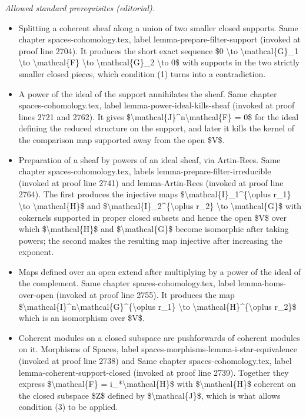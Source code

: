 \documentclass[10pt,a4paper]{amsart}
\theoremstyle{plain}
\theoremstyle{definition}
\theoremstyle{remark}
\numberwithin{equation}{subsection}
\begin{document}
\noindent\textit{Allowed standard prerequisites (editorial).}\begin{itemize}
\item Splitting a coherent sheaf along a union of two smaller closed supports. Same chapter spaces-cohomology.tex, label lemma-prepare-filter-support (invoked at proof line 2704). It produces the short exact sequence \$0 \textbackslash{}to \textbackslash{}mathcal\{G\}\_1 \textbackslash{}to \textbackslash{}mathcal\{F\} \textbackslash{}to \textbackslash{}mathcal\{G\}\_2 \textbackslash{}to 0\$ with supports in the two strictly smaller closed pieces, which condition (1) turns into a contradiction.
\item A power of the ideal of the support annihilates the sheaf. Same chapter spaces-cohomology.tex, label lemma-power-ideal-kills-sheaf (invoked at proof lines 2721 and 2762). It gives \$\textbackslash{}mathcal\{J\}\textasciicircum{}n\textbackslash{}mathcal\{F\} = 0\$ for the ideal defining the reduced structure on the support, and later it kills the kernel of the comparison map supported away from the open \$V\$.
\item Preparation of a sheaf by powers of an ideal sheaf, via Artin-Rees. Same chapter spaces-cohomology.tex, labels lemma-prepare-filter-irreducible (invoked at proof line 2741) and lemma-Artin-Rees (invoked at proof line 2764). The first produces the injective maps \$\textbackslash{}mathcal\{I\}\_1\textasciicircum{}\{\textbackslash{}oplus r\_1\} \textbackslash{}to \textbackslash{}mathcal\{H\}\$ and \$\textbackslash{}mathcal\{I\}\_2\textasciicircum{}\{\textbackslash{}oplus r\_2\} \textbackslash{}to \textbackslash{}mathcal\{G\}\$ with cokernels supported in proper closed subsets and hence the open \$V\$ over which \$\textbackslash{}mathcal\{H\}\$ and \$\textbackslash{}mathcal\{G\}\$ become isomorphic after taking powers; the second makes the resulting map injective after increasing the exponent.
\item Maps defined over an open extend after multiplying by a power of the ideal of the complement. Same chapter spaces-cohomology.tex, label lemma-homs-over-open (invoked at proof line 2755). It produces the map \$\textbackslash{}mathcal\{I\}\textasciicircum{}n\textbackslash{}mathcal\{G\}\textasciicircum{}\{\textbackslash{}oplus r\_1\} \textbackslash{}to \textbackslash{}mathcal\{H\}\textasciicircum{}\{\textbackslash{}oplus r\_2\}\$ which is an isomorphism over \$V\$.
\item Coherent modules on a closed subspace are pushforwards of coherent modules on it. Morphisms of Spaces, label spaces-morphisms-lemma-i-star-equivalence (invoked at proof line 2738) and Same chapter spaces-cohomology.tex, label lemma-coherent-support-closed (invoked at proof line 2739). Together they express \$\textbackslash{}mathcal\{F\} = i\_*\textbackslash{}mathcal\{H\}\$ with \$\textbackslash{}mathcal\{H\}\$ coherent on the closed subspace \$Z\$ defined by \$\textbackslash{}mathcal\{J\}\$, which is what allows condition (3) to be applied.
\end{itemize}\medskip
\end{document}
